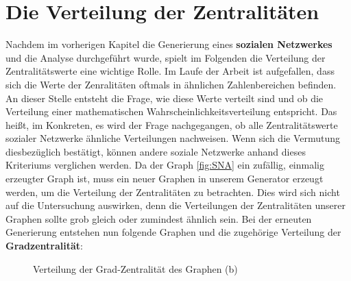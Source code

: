 \section{Die Verteilung der Zentralitäten}
Nachdem im vorherigen Kapitel die Generierung eines \textbf{sozialen Netzwerkes} und die Analyse durchgeführt wurde, spielt im Folgenden die Verteilung der Zentralitätswerte eine wichtige Rolle.
Im Laufe der Arbeit ist aufgefallen, dass sich die Werte der Zenralitäten oftmals in ähnlichen Zahlenbereichen befinden. An dieser Stelle entsteht die Frage, wie diese Werte verteilt sind und ob die Verteilung einer mathematischen Wahrscheinlichkeitsverteilung entspricht. Das heißt, im Konkreten, es wird der Frage nachgegangen, ob alle Zentralitätswerte sozialer Netzwerke ähnliche Verteilungen nachweisen. Wenn sich die Vermutung diesbezüglich bestätigt, können andere soziale Netzwerke anhand dieses Kriteriums verglichen werden.
Da der Graph \ref{fig:SNA} ein zufällig, einmalig erzeugter Graph ist, muss ein neuer Graphen in unserem Generator erzeugt werden, um die Verteilung der Zentralitäten zu betrachten. Dies wird sich nicht auf die Untersuchung auswirken, denn die Verteilungen der Zentralitäten unserer Graphen sollte grob gleich oder zumindest ähnlich sein. Bei der erneuten Generierung entstehen nun folgende Graphen und die zugehörige Verteilung der \textbf{Gradzentralität}:

\FloatBarrier
\begin{figure}[h!]%
  \centering
  \qquad
  \caption{Verteilung der Grad-Zentralität des Graphen (b)}%
  \label{fig:distribution}
\end{figure}
\FloatBarrier

